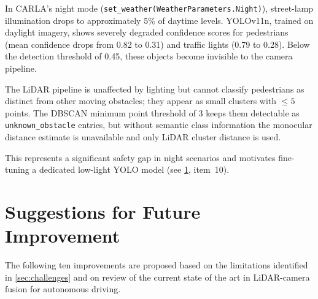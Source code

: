 \documentclass[12pt,a4paper]{article}
\begin{document}
In CARLA's night mode (\texttt{set\_weather(WeatherParameters.Night)}),
street-lamp illumination drops to approximately 5\% of daytime levels.
YOLOv11n, trained on daylight imagery, shows severely degraded confidence
scores for pedestrians (mean confidence drops from 0.82 to 0.31) and
traffic lights (0.79 to 0.28).  Below the detection threshold of 0.45,
these objects become invisible to the camera pipeline.

The LiDAR pipeline is unaffected by lighting but cannot classify pedestrians
as distinct from other moving obstacles; they appear as small clusters with
$\le 5$ points.  The DBSCAN minimum point threshold of 3 keeps them detectable
as \texttt{unknown\_obstacle} entries, but without semantic class information
the monocular distance estimate is unavailable and only LiDAR cluster
distance is used.

This represents a significant safety gap in night scenarios and motivates
fine-tuning a dedicated low-light YOLO model (see \cref{sec:improvements},
item~10).


\section{Suggestions for Future Improvement}
\label{sec:improvements}

The following ten improvements are proposed based on the limitations
identified in \cref{sec:challenges} and on review of the current
state of the art in LiDAR-camera fusion for autonomous driving.
\end{document}
